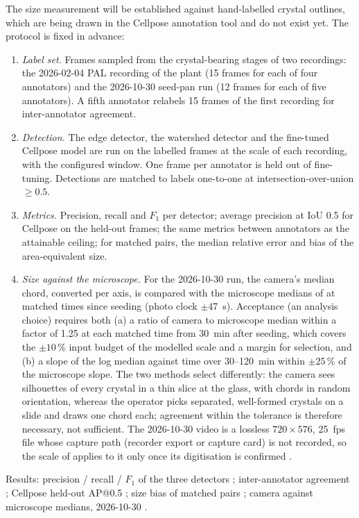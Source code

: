 The size measurement will be established against hand-labelled crystal outlines, which are being drawn in the
Cellpose annotation tool  and do not exist yet. The protocol is
fixed in advance:
\begin{enumerate}
\item \emph{Label set.} Frames sampled from the crystal-bearing stages of two recordings: the 2026-02-04 PAL
recording of the plant (15 frames for each of four annotators) and the 2026-10-30 seed-pan run (12 frames for each
of five annotators). A fifth annotator relabels 15 frames of the first recording for inter-annotator agreement.
\item \emph{Detection.} The edge detector, the watershed detector and the fine-tuned Cellpose model are run on the
labelled frames at the scale of each recording, with the configured window. One frame per annotator is held out of fine-tuning.
Detections are matched to labels one-to-one at intersection-over-union $\ge 0.5$.
\item \emph{Metrics.} Precision, recall and $F_1$ per detector; average precision at IoU 0.5 for Cellpose on the
held-out frames; the same metrics between annotators as the attainable ceiling; for matched pairs, the median
relative error and bias of the area-equivalent size.
\item \emph{Size against the microscope.} For the 2026-10-30 run, the camera's median chord, converted per axis,
is compared with the microscope medians of  at matched times since seeding (photo clock
$\pm 47$~s). Acceptance (an analysis choice) requires both (a) a ratio of camera to microscope median within a
factor of 1.25 at each matched time from 30~min after seeding, which covers the $\pm 10$\,\% input budget of the modelled scale and a
margin for selection, and (b) a slope of the log median against time over 30--120~min within $\pm 25$\,\% of the
microscope slope. The two methods select differently: the camera sees silhouettes of every crystal in a thin slice at
the glass, with chords in random orientation, whereas the operator picks separated, well-formed crystals on a slide
and draws one chord each; agreement within the tolerance is therefore necessary, not sufficient. The 2026-10-30
video is a lossless $720 \times 576$, 25~fps file whose capture path (recorder export or capture card) is not
recorded, so the scale of  applies to it only once its digitisation is confirmed
.
\end{enumerate}
Results: precision / recall / $F_1$ of the three detectors ; inter-annotator
agreement ; Cellpose held-out AP@0.5 ; size
bias of matched pairs ; camera against microscope medians, 2026-10-30
.

